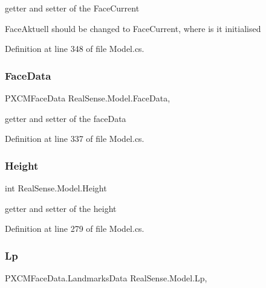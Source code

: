 getter and setter of the Face\+Current

Face\+Aktuell should be changed to Face\+Current, where is it initialised 

Definition at line 348 of file Model.\+cs.

\mbox{\label{class_real_sense_1_1_model_a0d16c2536a9f3c346cc3d51b3227989e}} 
\subsubsection{\texorpdfstring{Face\+Data}{FaceData}}
{\footnotesize\ttfamily P\+X\+C\+M\+Face\+Data Real\+Sense.\+Model.\+Face\+Data\hspace{0.3cm}{\ttfamily [get]}, {\ttfamily [set]}}

getter and setter of the face\+Data 

Definition at line 337 of file Model.\+cs.

\mbox{\label{class_real_sense_1_1_model_abf6324c9f4acc3134909a239eff37a0a}} 
\subsubsection{\texorpdfstring{Height}{Height}}
{\footnotesize\ttfamily int Real\+Sense.\+Model.\+Height\hspace{0.3cm}{\ttfamily [get]}}

getter and setter of the height 

Definition at line 279 of file Model.\+cs.

\mbox{\label{class_real_sense_1_1_model_a3e349d000d00015a340954ec3be977ea}} 
\subsubsection{\texorpdfstring{Lp}{Lp}}
{\footnotesize\ttfamily P\+X\+C\+M\+Face\+Data.\+Landmarks\+Data Real\+Sense.\+Model.\+Lp\hspace{0.3cm}{\ttfamily [get]}, {\ttfamily [set]}}


